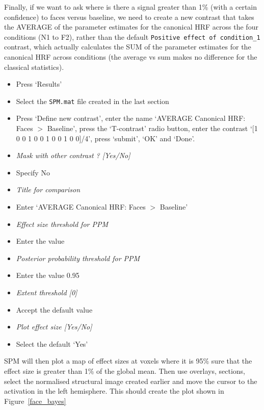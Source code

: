 \documentclass[a4paper,titlepage]{book}
\newcommand{\bi}{\begin{itemize}}
\newcommand{\ei}{\end{itemize}}
\begin{document}
Finally, if we want to ask where is there a signal greater than 1\% (with a certain confidence) to faces versus baseline, we need to create a new contrast that takes the AVERAGE of the parameter estimates for the canonical HRF across the four conditions (N1 to F2), rather than the default \verb!Positive effect of condition_1! contrast, which actually calculates the SUM of the parameter estimates for the canonical HRF across conditions (the average vs sum makes no difference for the classical statistics).

\bi
\item{Press `Results'}
\item{Select the \verb!SPM.mat! file created in the last section}
\item{Press `Define new contrast', enter the name `AVERAGE Canonical HRF: Faces $>$ Baseline', press the `T-contrast' radio button, enter the contrast `[1 0 0 1 0 0 1 0 0 1 0 0]/4', press `submit', `OK' and `Done'.}
\item{\em Mask with other contrast ? [Yes/No]}
\item{Specify No}
\item{\em Title for comparison}
\item{Enter `AVERAGE Canonical HRF: Faces $>$ Baseline'}
\item{\em Effect size threshold for PPM}
\item{Enter the value }
\item{\em Posterior probability threshold for PPM}
\item{Enter the value 0.95}
\item{\em Extent threshold [0]}
\item{Accept the default value}
\item{\em Plot effect size [Yes/No]}
\item{Select the default `Yes'}
\ei
SPM will then plot a map of effect sizes at voxels 
where it is 95\% sure that the effect size is greater 
than 1\% of the global mean.
Then use overlays, sections, select the 
normalised structural image created earlier and move the cursor to the activation in the left hemisphere. This should create the plot shown in Figure~\ref{face_bayes}
\end{document}
